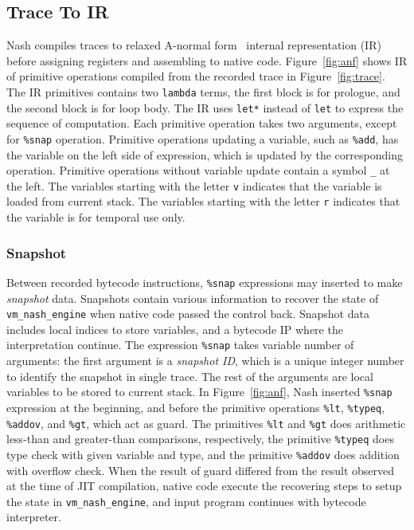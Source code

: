 \documentclass[preprint, 10pt]{sigplanconf}
\begin{document}
\subsection{Trace To IR}
Nash compiles traces to relaxed A-normal form~\cite{flanagan1993essence}
internal representation (IR) before assigning registers and assembling to
native code. Figure~\hyperref[fig:anf]{\ref{fig:anf}} shows IR of primitive
operations compiled from the recorded trace in
Figure~\hyperref[fig:trace]{\ref{fig:trace}}. The IR primitives contains two
\texttt{lambda} terms, the first block is for prologue, and the second block
is for loop body. The IR uses \texttt{let*} instead of \texttt{let} to express
the sequence of computation. Each primitive operation takes two arguments,
except for \texttt{\%snap} operation. Primitive operations updating a
variable, such as \texttt{\%add}, has the variable on the left side of
expression, which is updated by the corresponding operation. Primitive
operations without variable update contain a symbol \texttt{\_} at the
left. The variables starting with the letter \texttt{v} indicates that the
variable is loaded from current stack. The variables starting with the letter
\texttt{r} indicates that the variable is for temporal use only.

\subsubsection{Snapshot}

Between recorded bytecode instructions, \texttt{\%snap} expressions may
inserted to make \textit{snapshot} data. Snapshots contain various information
to recover the state of \texttt{vm\_nash\_engine} when native code passed the
control back. Snapshot data includes local indices to store variables, and a
bytecode IP where the interpretation continue. The expression \texttt{\%snap}
takes variable number of arguments: the first argument is a \textit{snapshot
  ID}, which is a unique integer number to identify the snapshot in single
trace. The rest of the arguments are local variables to be stored to current
stack. In Figure~\hyperref[fig:anf]{\ref{fig:anf}}, Nash inserted
\texttt{\%snap} expression at the beginning, and before the primitive
operations \texttt{\%lt}, \texttt{\%typeq}, \texttt{\%addov}, and
\texttt{\%gt}, which act as guard. The primitives \texttt{\%lt} and
\texttt{\%gt} does arithmetic less-than and greater-than comparisons,
respectively, the primitive \texttt{\%typeq} does type check with given
variable and type, and the primitive \texttt{\%addov} does addition with
overflow check. When the result of guard differed from the result observed at
the time of JIT compilation, native code execute the recovering steps to setup
the state in \texttt{vm\_nash\_engine}, and input program continues with
bytecode interpreter.
\end{document}

